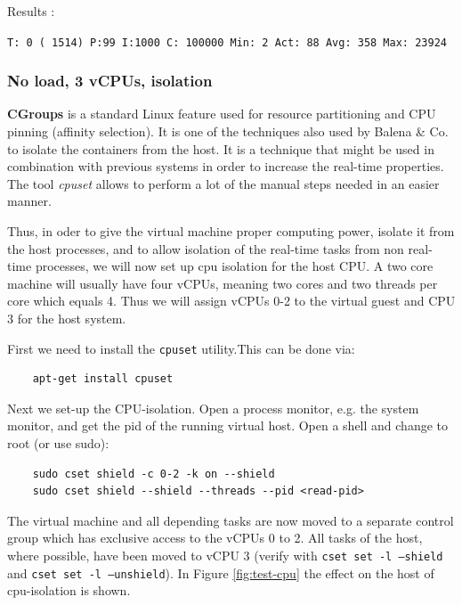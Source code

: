 \documentclass[]{scrartcl}
\begin{document}
\noindent Results :

\noindent \texttt{T: 0 ( 1514) P:99 I:1000 C: 100000 Min:      2 Act:   88 Avg:  358 Max:   23924}

\subsubsection{No load, 3 vCPUs, isolation}

\textbf{CGroups} is a standard Linux feature used for resource partitioning and CPU pinning (affinity selection). It is one of the techniques also used by Balena \& Co. to isolate the containers from the host. It is a technique that might be used in combination with previous systems in order to increase the real-time properties. The tool \textit{cpuset} allows to perform a lot of the manual steps needed in an easier manner. 

Thus, in oder to give the virtual machine proper computing power, isolate it from the host processes, and to allow isolation of the real-time tasks from non real-time processes, we will now set up cpu isolation for the host CPU. A two core machine will usually have four vCPUs, meaning two cores and two threads per core which equals 4. Thus we will assign vCPUs 0-2 to the virtual guest and CPU 3 for the host system.

First we need to install the \texttt{cpuset} utility.This can be done via:

\begin{verbatim}
	apt-get install cpuset
\end{verbatim}

Next we set-up the CPU-isolation. Open a process monitor, e.g. the system monitor, and get the pid of the running virtual host. Open a shell and change to root (or use sudo):

\begin{verbatim}
	sudo cset shield -c 0-2 -k on --shield
	sudo cset shield --shield --threads --pid <read-pid>
\end{verbatim}

The virtual machine and all depending tasks are now moved to a separate control group which has exclusive access to the vCPUs 0 to 2. All tasks of the host, where possible, have been moved to vCPU 3 (verify with \texttt{cset set -l --shield} and \texttt{cset set -l --unshield}). In Figure \ref{fig:test-cpu} the effect on the host of cpu-isolation is shown.
\end{document}
